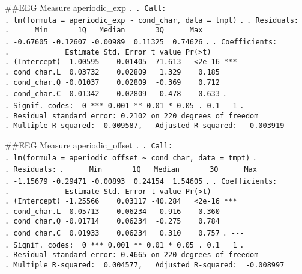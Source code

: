 \documentclass[
]{article}
\begin{document}
\#\#EEG Measure aperiodic\_exp \texttt{.} \texttt{.\ Call:}
\texttt{.\ lm(formula\ =\ aperiodic\_exp\ \textasciitilde{}\ cond\_char,\ data\ =\ tmpt)}
\texttt{.} \texttt{.\ Residuals:}
\texttt{.\ \ \ \ \ \ Min\ \ \ \ \ \ \ 1Q\ \ \ Median\ \ \ \ \ \ \ 3Q\ \ \ \ \ \ Max}
\texttt{.\ -0.67605\ -0.12607\ -0.00989\ \ 0.11325\ \ 0.74626}
\texttt{.} \texttt{.\ Coefficients:}
\texttt{.\ \ \ \ \ \ \ \ \ \ \ \ \ Estimate\ Std.\ Error\ t\ value\ Pr(\textgreater{}\textbar{}t\textbar{})}
\texttt{.\ (Intercept)\ \ 1.00595\ \ \ \ 0.01405\ \ 71.613\ \ \ \textless{}2e-16\ ***}
\texttt{.\ cond\_char.L\ \ 0.03732\ \ \ \ 0.02809\ \ \ 1.329\ \ \ \ 0.185}
\texttt{.\ cond\_char.Q\ -0.01037\ \ \ \ 0.02809\ \ -0.369\ \ \ \ 0.712}
\texttt{.\ cond\_char.C\ \ 0.01342\ \ \ \ 0.02809\ \ \ 0.478\ \ \ \ 0.633}
\texttt{.\ -\/-\/-}
\texttt{.\ Signif.\ codes:\ \ 0\ \textquotesingle{}***\textquotesingle{}\ 0.001\ \textquotesingle{}**\textquotesingle{}\ 0.01\ \textquotesingle{}*\textquotesingle{}\ 0.05\ \textquotesingle{}.\textquotesingle{}\ 0.1\ \textquotesingle{}\ \textquotesingle{}\ 1}
\texttt{.}
\texttt{.\ Residual\ standard\ error:\ 0.2102\ on\ 220\ degrees\ of\ freedom}
\texttt{.\ Multiple\ R-squared:\ \ 0.009587,\ \ \ Adjusted\ R-squared:\ \ -0.003919}

\#\#EEG Measure aperiodic\_offset \texttt{.} \texttt{.\ Call:}
\texttt{.\ lm(formula\ =\ aperiodic\_offset\ \textasciitilde{}\ cond\_char,\ data\ =\ tmpt)}
\texttt{.} \texttt{.\ Residuals:}
\texttt{.\ \ \ \ \ \ Min\ \ \ \ \ \ \ 1Q\ \ \ Median\ \ \ \ \ \ \ 3Q\ \ \ \ \ \ Max}
\texttt{.\ -1.15679\ -0.29471\ -0.00893\ \ 0.24154\ \ 1.54605}
\texttt{.} \texttt{.\ Coefficients:}
\texttt{.\ \ \ \ \ \ \ \ \ \ \ \ \ Estimate\ Std.\ Error\ t\ value\ Pr(\textgreater{}\textbar{}t\textbar{})}
\texttt{.\ (Intercept)\ -1.25566\ \ \ \ 0.03117\ -40.284\ \ \ \textless{}2e-16\ ***}
\texttt{.\ cond\_char.L\ \ 0.05713\ \ \ \ 0.06234\ \ \ 0.916\ \ \ \ 0.360}
\texttt{.\ cond\_char.Q\ -0.01714\ \ \ \ 0.06234\ \ -0.275\ \ \ \ 0.784}
\texttt{.\ cond\_char.C\ \ 0.01933\ \ \ \ 0.06234\ \ \ 0.310\ \ \ \ 0.757}
\texttt{.\ -\/-\/-}
\texttt{.\ Signif.\ codes:\ \ 0\ \textquotesingle{}***\textquotesingle{}\ 0.001\ \textquotesingle{}**\textquotesingle{}\ 0.01\ \textquotesingle{}*\textquotesingle{}\ 0.05\ \textquotesingle{}.\textquotesingle{}\ 0.1\ \textquotesingle{}\ \textquotesingle{}\ 1}
\texttt{.}
\texttt{.\ Residual\ standard\ error:\ 0.4665\ on\ 220\ degrees\ of\ freedom}
\texttt{.\ Multiple\ R-squared:\ \ 0.004577,\ \ \ Adjusted\ R-squared:\ \ -0.008997}
\end{document}
